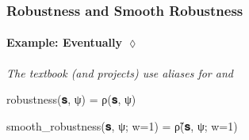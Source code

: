 

\begin{frame}[fragile,t]
\frametitle{Robustness and Smooth Robustness}
\framesubtitle{Example: Eventually $\lozenge$}

\phantom{}

\begin{small}
\textit{The textbook (and projects) use aliases for  and }
\end{small}

\phantom{}

\pause
\begin{juliaverbatim}
robustness(𝐬, ψ) = ρ(𝐬, ψ)
\end{juliaverbatim}

\begin{juliaverbatim}
smooth_robustness(𝐬, ψ; w=1) = ρ̃(𝐬, ψ; w=1)
\end{juliaverbatim}

\end{frame}